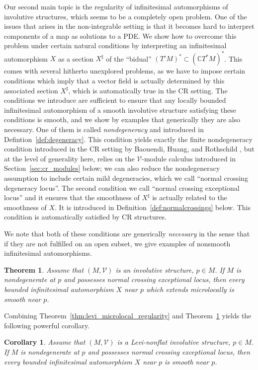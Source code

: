 \documentclass[11pt]{amsart}
\newcommand{\crb}{\mathcal{V}}
\newcommand{\C}{\mathbb{C}}
\theoremstyle{definition}
\theoremstyle{remark}
\theoremstyle{plain}
\newtheorem{cor}[defn]{Corollary}
\newtheorem{thm}[defn]{Theorem}
\begin{document}
Our second main topic is the regularity of infinitesimal automorphisms of involutive structures, which
seems to be a completely open problem. One of the issues that arises in the non-integrable setting
is that it becomes hard to interpret components of a map as solutions to a PDE. We show
how to overcome this problem under certain natural conditions by interpreting an infinitesimal
automorphism $X$ as a section $X^\sharp$ of the ``bidual'' $(T'M)^* \subset (\C T^*M)^*$. This comes with several hitherto
unexplored problems, as we have to impose certain conditions which imply that a vector field
is actually determined by this associated section $X^\sharp$, which is automatically true in the CR setting. The
conditions we introduce are  sufficient to ensure  that any locally bounded infinitesimal automorphism
of a smooth involutive structure satisfying these conditions is smooth, and we show by examples that
generically they are also necessary. One of them is called {\em nondegeneracy} and introduced in
Defintion~\ref{def:degeneracy}. This condition yields exactly the finite nondegeneracy condition introduced 
in the CR setting by Baouendi, Huang, and Rothschild \cite{baouendi1996}, but at the level of generality here, relies on the $\crb$-module calculus introduced in Section~\ref{sec:cr_modules}
below; we can also reduce the nondegeneracy assumption to include certain mild degeneracies, which we call ``normal crossing degeneracy locus''. The second condition we  call ``normal crossing exceptional locus''
and it ensures that the smoothness of $X^\sharp$ is actually related to the smoothness of $X$. It
is introduced in  Definition~\ref{def:normalcrossings} below. This condition is automatically
satisfied by CR structures. 

We note that both of these conditions are generically {\em necessary} in the sense that
if they are not fulfilled on an open subset, we give examples of nonsmooth infinitesimal
automorphisms. 

\begin{thm}\label{thm:mainautos}
  Assume that $(M,\crb)$ is an involutive structure, $p\in M$. If $M$ is 
  nondegenerate at $p$ and possesses normal crossing exceptional locus,
  then every bounded infinitesimal automorphism $X$ near $p$ which extends
  microlocally is smooth near $p$. 
\end{thm}

Combining Theorem~\ref{thm:levi_microlocal_regularity} and Theorem~\ref{thm:mainautos} yields the following powerful
corollary.
\begin{cor}\label{cor:mainautos}
  Assume that $(M,\crb)$ is a Levi-nonflat involutive structure, $p\in M$. If $M$ is 
  nondegenerate at $p$ and possesses normal crossing exceptional locus,
  then every bounded infinitesimal automorphism $X$ near $p$  is smooth near $p$. 
\end{cor}
\end{document}
